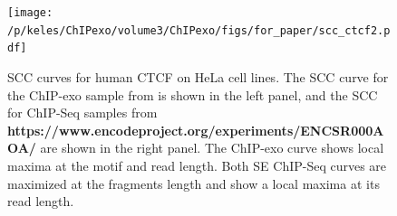 \documentclass{bmcart}\usepackage[]{graphicx}\usepackage[]{color}
\newcommand{\sig}{\sigma^{70}}
\begin{document}
\newpage

\begin{figure}[h!]
\centering
\texttt{[image: /p/keles/ChIPexo/volume3/ChIPexo/figs/for\_paper/scc\_ctcf2.pdf]}
\caption{SCC curves for human CTCF on HeLa cell lines.  The SCC curve
  for the ChIP-exo sample from \cite{exo1} is shown in the left panel,
  and the SCC for ChIP-Seq samples from
  \textbf{https://www.encodeproject.org/experiments/ENCSR000AOA/} are
  shown in the right panel. The ChIP-exo curve shows local maxima at
  the motif and read length. Both SE ChIP-Seq curves are maximized at
  the fragments length and show a local maxima at its read length. }
  \label{fig:scc_exo}
\end{figure}

\newpage
\end{document}
